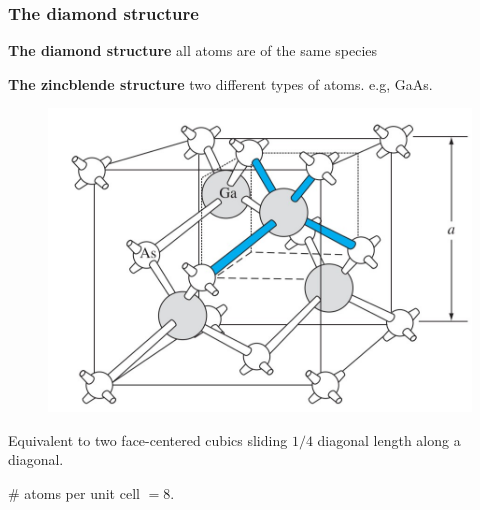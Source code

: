 \documentclass{beamer}
\begin{document}
    \begin{frame} \frametitle{The diamond structure}
        \par \textbf{The diamond structure } all atoms are of the same species
        \par \textbf{The zincblende structure } two different types of atoms. e.g, GaAs.
        \begin{figure}[H]
            \centering
            \includegraphics[width=0.5\linewidth]{GaAs_zincblende.jpg}
            \label{fig:GaAs_zincblende.jpg}
        \end{figure}
        \par Equivalent to two face-centered cubics sliding $1/4$ diagonal length along a diagonal.


        \begin{center}
            \# atoms per unit cell $= 8$.
        \end{center}
    \end{frame}
\end{document}
